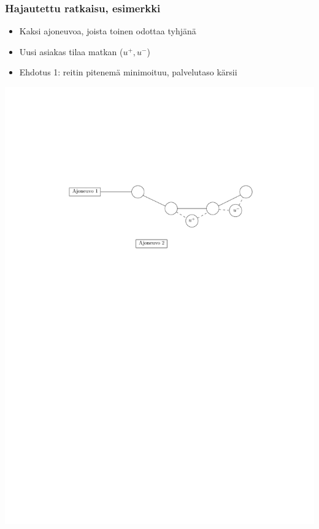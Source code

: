 \documentclass{beamer}
\begin{document}
                        \begin{frame}
  \frametitle{Hajautettu ratkaisu, esimerkki}   %
\begin{minipage}[t][0.3\textheight][t]{\textwidth}
  \begin{itemize}
 \item 
 Kaksi ajoneuvoa, joista toinen odottaa tyhjänä
   \item 
 Uusi asiakas tilaa matkan ($u^+,u^-$)
 \item
 Ehdotus 1: reitin pitenemä minimoituu, palvelutaso kärsii
\end{itemize}
  \end{minipage}
  \vfill
  \begin{minipage}{\textwidth}
    \centering
\includegraphics[scale=0.6]{valinta03}
  \end{minipage}
  
  \end{frame}
  
\end{document}
